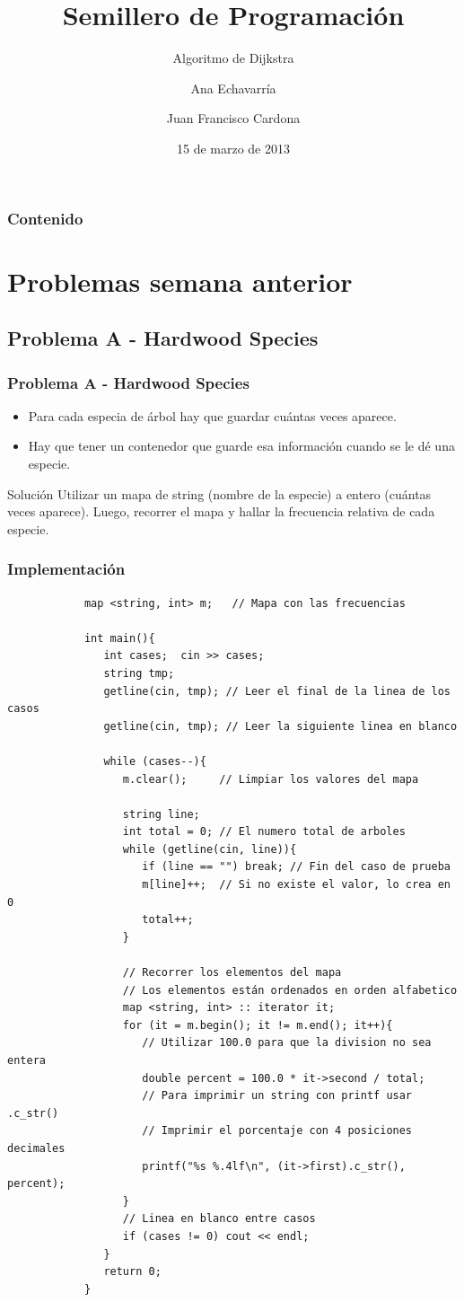\documentclass{beamer}
\title{Semillero de Programación}
\subtitle{Algoritmo de Dijkstra}
\author{Ana Echavarría \and Juan Francisco Cardona}
\institute{Universidad EAFIT}
\date{15 de marzo de 2013}
\begin{document}
\begin{frame}
	\titlepage
\end{frame}

\begin{frame}
	\frametitle{Contenido}
	\tableofcontents
\end{frame}

\section{Problemas semana anterior}
	\subsection{Problema A - Hardwood Species}
	\begin{frame}
		\frametitle{Problema A - Hardwood Species}
		\begin{itemize}
			\item Para cada especia de árbol hay que guardar cuántas veces aparece.
			\item Hay que tener un contenedor que guarde esa información cuando se le dé una especie.
		\end{itemize}
		\pause
		\begin{exampleblock}{Solución}
			Utilizar un mapa de string (nombre de la especie) a entero (cuántas veces aparece). Luego, recorrer el mapa y hallar la frecuencia relativa de cada especie.
		\end{exampleblock}
	\end{frame}
	
	\begin{frame}
		\frametitle{Implementación}
		\begin{lstlisting}
			map <string, int> m;   // Mapa con las frecuencias

			int main(){
			   int cases;  cin >> cases;
			   string tmp;
			   getline(cin, tmp); // Leer el final de la linea de los casos
			   getline(cin, tmp); // Leer la siguiente linea en blanco
			   
			   while (cases--){
			      m.clear();     // Limpiar los valores del mapa

			      string line;
			      int total = 0; // El numero total de arboles
			      while (getline(cin, line)){
			         if (line == "") break; // Fin del caso de prueba
			         m[line]++;  // Si no existe el valor, lo crea en 0
			         total++;  
			      }
			      
			      // Recorrer los elementos del mapa
			      // Los elementos están ordenados en orden alfabetico
			      map <string, int> :: iterator it;
			      for (it = m.begin(); it != m.end(); it++){
			         // Utilizar 100.0 para que la division no sea entera
			         double percent = 100.0 * it->second / total;
			         // Para imprimir un string con printf usar .c_str()
			         // Imprimir el porcentaje con 4 posiciones decimales
			         printf("%s %.4lf\n", (it->first).c_str(), percent);
			      }
			      // Linea en blanco entre casos
			      if (cases != 0) cout << endl; 
			   }
			   return 0;
			}
		\end{lstlisting}
	\end{frame}
	
\end{document}
